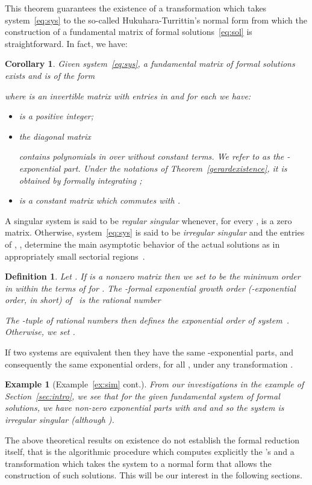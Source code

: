 \documentclass[final,1p,times,number,amsthm]{elsart}
\newtheorem{corollary}[lemma]{Corollary}
\newtheorem{example}[lemma]{Example}
\newtheorem{definition}[lemma]{Definition}
\begin{document}
This theorem guarantees the existence of a transformation which takes
system~\eqref{eq:sys} to the so-called Hukuhara-Turrittin's normal form from
which the construction of a fundamental matrix of formal
solutions~\eqref{eq:sol} is straightforward.  In fact, we have:
\begin{corollary}
  \label{gerardsol}
  Given system~\eqref{eq:sys}, a fundamental matrix of formal solutions exists
  and is of the form
  
  where  is an invertible matrix with entries in  and for each
   we have:
  \begin{itemize}
  \item  is a positive integer;
  \item the diagonal matrix
    
    contains polynomials in  over 
    without constant terms. We refer to  as the
    -exponential part. Under the notations of
    Theorem~\ref{gerardexistence}, it is obtained by formally integrating
    ;
  \item  is a constant matrix which commutes with
    .
  \end{itemize}
\end{corollary}
A singular system  is said to be \textit{regular singular} whenever, for every
,  is a zero matrix.  Otherwise,
system~\eqref{eq:sys} is said to be \textit{irregular singular} and the entries
of , , determine the main asymptotic behavior
of the actual solutions as  in appropriately small sectorial
regions~\cite[Proposition 5.2, pp 232, and Section~4]{key1}.
\begin{definition}
\label{katzpfaff}
Let . If  is a nonzero matrix then we set  to be the minimum order in  within the terms
of
 for . The -\textit{formal exponential growth order}
(-exponential order, in short) of~ is the rational number

The -tuple of rational numbers
 then defines the exponential
order of system~. Otherwise, we set .
\end{definition}
If two systems are equivalent then they have the same -exponential parts,
and consequently the same  exponential orders, for all ,
under any transformation .
\begin{example}[Example~\ref{ex:sim} cont.]
  From our investigations in the example of Section~\ref{sec:intro}, we see that
  for the given fundamental system of formal solutions, we have non-zero exponential
  parts with  and  and so the system is irregular
  singular (although ).
\end{example}
The above theoretical results on existence do not establish the formal reduction
itself, that is the algorithmic procedure which computes explicitly the
's and a transformation which takes the system to a normal form that
allows the construction of such solutions. This will be our interest in the
following sections.
\end{document}

